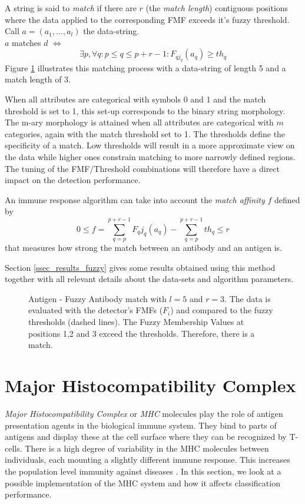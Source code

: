 \documentclass{llncs}
\begin{document}
A string is said to {\it match} if there are $r$ (the {\it match length}) contiguous positions where the data applied to the corresponding FMF exceeds it's fuzzy threshold.
Call $a = (a_1, \ldots, a_l)$ the data-string.
\\
$a$ matches $d$ $\Leftrightarrow$
$$
  \exists p, \forall q  : p \leq q \leq {p+r-1} : F_{qj_q}(a_q) \geq th_q
$$
Figure \ref{fig_fuzzy_match} illustrates this matching process with a data-string of length 5 and a match length of 3.

When all attributes are categorical with symbols 0 and 1 and the match threshold is set to 1, this set-up corresponds to the binary string morphology.
The m-ary morphology is attained when all attributes are categorical with $m$ categories, again with the match threshold set to 1. 
The thresholds define the specificity of a match.
Low thresholds will result in a more approximate view on the data while higher ones constrain matching to more narrowly defined regions.
The tuning of the FMF/Threshold combinations will therefore have a direct impact on the detection performance.

An immune response algorithm can take into account the {\it match affinity} $f$ defined by
\begin{equation}
  0 \leq f = \sum_{q=p}^{p+r-1}{F_qj_q}(a_q) - \sum_{q=p}^{p+r-1}{th_q} \leq r
\end{equation}
that measures how strong the match between an antibody and an antigen is.

Section \ref{ssec_results_fuzzy} gives some results obtained using this method together with all relevant details about the data-sets and algorithm parameters.

\begin{figure}[thp]
   \centerline{
              } 
   \caption{Antigen - Fuzzy Antibody match with $l=5$ and $r=3$.
             The data is evaluated with the detector's FMFs ($F_i$) and compared to the fuzzy thresholds (dashed lines).
             The Fuzzy Membership Values at positions 1,2 and 3 exceed the thresholds. Therefore, there is a match.}
   \label{fig_fuzzy_match}
\end{figure}

\section{Major Histocompatibility Complex}
\label{sec_mhc}
{\it Major Histocompatibility Complex} or {\it MHC} molecules play the role of antigen presentation agents in the biological immune system.
They bind to parts of antigens and display these at the cell surface where they can be recognized by T-cells.
There is a high degree of variability in the MHC molecules between individuals, each mounting a slightly different immune response.
This increases the population level immunity against diseases \cite{parham}.
In this section, we look at a possible implementation of the MHC system and how it affects classification performance. 
\end{document}
